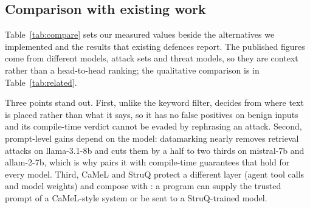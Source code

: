 \documentclass[journal]{IEEEtran}
\begin{document}
\subsection{Comparison with existing work}\label{sec:compare}
Table~\ref{tab:compare} sets our measured values beside the alternatives we implemented and the results that existing defences report. The published figures come from different models, attack sets and threat models, so they are context rather than a head-to-head ranking; the qualitative comparison is in Table~\ref{tab:related}.

\begin{table}[t]
\caption{Measured and reported results of prompt-injection defences}
\label{tab:compare}
\centering
{}
\end{table}

Three points stand out. First, unlike the keyword filter, \TL{} decides from where text is placed rather than what it says, so it has no false positives on benign inputs and its compile-time verdict cannot be evaded by rephrasing an attack. Second, prompt-level gains depend on the model: datamarking nearly removes retrieval attacks on llama-3.1-8b and cuts them by a half to two thirds on mistral-7b and allam-2-7b, which is why \TL{} pairs it with compile-time guarantees that hold for every model. Third, CaMeL and StruQ protect a different layer (agent tool calls and model weights) and compose with \TL{}: a \TL{} program can supply the trusted prompt of a CaMeL-style system or be sent to a StruQ-trained model.
\end{document}
